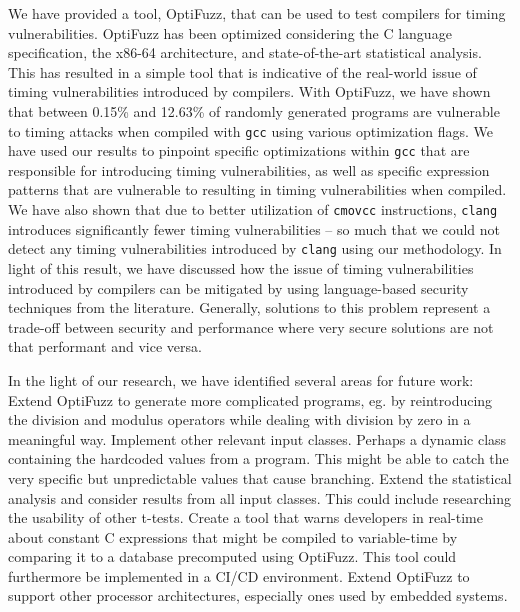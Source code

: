 
We have provided a tool, OptiFuzz, that can be used to test compilers for timing vulnerabilities.
OptiFuzz has been optimized considering the C language specification, the x86-64 architecture, and state-of-the-art statistical analysis.
This has resulted in a simple tool that is indicative of the real-world issue of timing vulnerabilities introduced by compilers.
With OptiFuzz, we have shown that between 0.15\% and 12.63\% of randomly generated programs are vulnerable to timing attacks when compiled with \texttt{gcc} using various optimization flags.
We have used our results to pinpoint specific optimizations within \texttt{gcc} that are responsible for introducing timing vulnerabilities, as well as specific expression patterns that are vulnerable to resulting in timing vulnerabilities when compiled.
We have also shown that due to better utilization of \texttt{cmovcc} instructions, \texttt{clang} introduces significantly fewer timing vulnerabilities -- so much that we could not detect any timing vulnerabilities introduced by \texttt{clang} using our methodology.
In light of this result, we have discussed how the issue of timing vulnerabilities introduced by compilers can be mitigated by using language-based security techniques from the literature.
Generally, solutions to this problem represent a trade-off between security and performance where very secure solutions are not that performant and vice versa.

In the light of our research, we have identified several areas for future work:
Extend OptiFuzz to generate more complicated programs, eg. by reintroducing the division and modulus operators while dealing with division by zero in a meaningful way.
Implement other relevant input classes. Perhaps a dynamic class containing the hardcoded values from a program. This might be able to catch the very specific but unpredictable values that cause branching.
Extend the statistical analysis and consider results from all input classes. This could include researching the usability of other t-tests.
Create a tool that warns developers in real-time about constant C expressions that might be compiled to variable-time by comparing it to a database precomputed using OptiFuzz. This tool could furthermore be implemented in a CI/CD environment.
Extend OptiFuzz to support other processor architectures, especially ones used by embedded systems.
